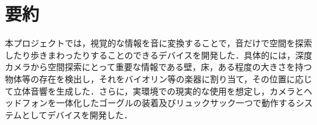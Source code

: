 \section{要約}
本プロジェクトでは，視覚的な情報を音に変換することで，音だけで空間を探索したり歩きまわったりすることのできるデバイスを開発した．具体的には，深度カメラから空間探索にとって重要な情報である壁，床，ある程度の大きさを持つ物体等の存在を検出し，それをバイオリン等の楽器に割り当て，その位置に応じて立体音響を生成した．さらに，実環境での現実的な使用を想定し，カメラとヘッドフォンを一体化したゴーグルの装着及びリュックサック一つで動作するシステムとしてデバイスを開発した．
